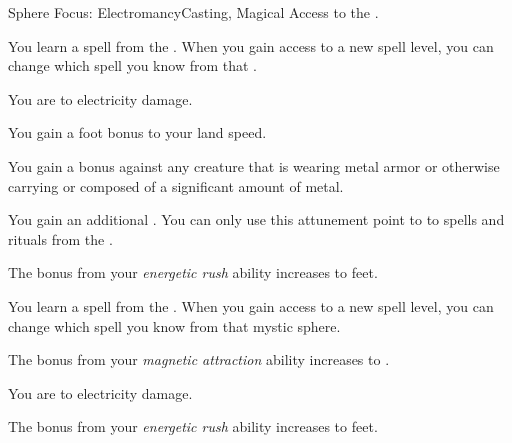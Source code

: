     \begin{feat}{Sphere Focus: Electromancy}{Casting, Magical}
        \featpre Access to the  .

         You learn a spell from the  .
        When you gain access to a new spell level, you can change which spell you know from that .

         You are  to electricity damage.

         You gain a  foot bonus to your land speed.

         You gain a   bonus against any creature that is wearing metal armor or otherwise carrying or composed of a significant amount of metal.

         You gain an additional .
        You can only use this attunement point to  to spells and rituals from the  .

         The bonus from your \textit{energetic rush} ability increases to  feet.

         You learn a spell from the  .
        When you gain access to a new spell level, you can change which spell you know from that mystic sphere.

         The bonus from your \textit{magnetic attraction} ability increases to .

         You are  to electricity damage.

         The bonus from your \textit{energetic rush} ability increases to  feet.
    \end{feat}

